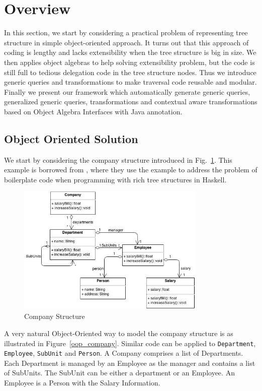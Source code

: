 \section{Overview}\label{subsec:overview}
In this section, we start by considering a practical problem of representing tree structure in simple object-oriented approach. It turns out that this approach of coding is lengthy and lacks extensibility when the tree structure is big in size. We then applies object algebras to help solving extensibility problem, but the code is still full to tedious delegation code in the tree structure nodes. Thus we introduce generic queries and transformations to make traversal code reusable and modular. Finally we present our framework \name which automatically generate generic queries, generalized generic queries, transformations and contextual aware transformations based on Object Algebra Interfaces with Java annotation.

\subsection{Object Oriented Solution}
We start by considering the company structure introduced in
Fig.~\ref{company_structure}. This example is borrowed from \cite{ralf03syb}, where they use the example to address the problem of boilerplate code when programming with rich tree structures in Haskell. 

\begin{figure}[ht!]
\centering
\includegraphics[width=90mm]{Company.jpg}
\caption{Company Structure \label{company_structure}}
\end{figure}

A very natural Object-Oriented way to model the company structure is
as illustrated in Figure~\ref{oop_company}. Similar code can be applied to
\lstinline{Department},
\lstinline{Employee}, \lstinline{SubUnit} and \lstinline{Person}. A Company comprises a list of
Departments. Each Department is managed by an Employee as the manager
and contains a list of SubUnits. The SubUnit can be either a
department or an Employee. An Employee is a Person with the Salary
Information.

